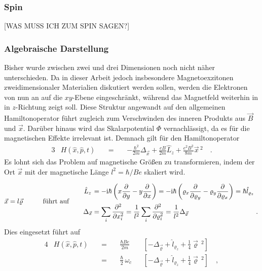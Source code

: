 \documentclass[a4paper,11pt, twoside]{article}
\newcommand{\+}{\dagger}
\newcommand{\pd}[2]{\frac{\partial #1}{\partial #2}}
\renewcommand{\'}{\tt\textquotesingle}
\renewcommand{\it}{\mathit}
\renewcommand{\v}{\vec}
\renewcommand{\^}{\hat}
\renewcommand{\tt}{\text}
\renewcommand{\~}{\widetilde}
\begin{document}
\subsubsection{Spin}
[WAS MUSS ICH ZUM SPIN SAGEN?]
\subsubsection{Algebraische Darstellung}
Bisher wurde zwischen zwei und drei Dimensionen noch nicht näher unterschieden. Da in dieser Arbeit jedoch insbesondere Magnetoexzitonen zweidimensionaler Materialien diskutiert werden sollen, werden die Elektronen von nun an auf die $xy$-Ebene eingeschränkt, während das Magnetfeld weiterhin in in $z$-Richtung zeigt soll. Diese Struktur angewandt auf den allgemeinen Hamiltonoperator führt zugleich zum Verschwinden des inneren Produkts aus $\v B$ und $\v x$. Darüber hinaus wird das Skalarpotential $\it \Phi$ vernachlässigt, da es für die magnetischen Effekte irrelevant ist. Demnach gilt für den Hamiltonoperator 
\begin{alignat*}{3}
& H(\^ x,\^ p,t)&& \ =\  && -\frac{\hbar^2}{2m}\Delta_{\v x} + \frac{eB}{2m} \^L_z  +\frac{e^2B^2}{8m}\v x \,^2  \quad .
\end{alignat*}
Es lohnt sich das Problem auf magnetische Größen zu transformieren, indem der Ort $\v x$ mit der magnetische Länge $l^2=\hbar / Be$ skaliert wird.
\begin{alignat*}{4}
\v x  = l \v \varrho  &&\qquad \tt{führt auf} \quad && 
\arraycolsep=1.4pt\def\arraystretch{2.2}
\begin{array}{*1{>{\displaystyle}c} *1{>{\displaystyle}l} *1{>{\displaystyle}r}}
 \^L_z  &= -\tt i \hbar \left (x\pd{}{y}-y\pd{}{x}\right ) =  -\tt i \hbar \left (\varrho_x\pd{}{\varrho_y}-\varrho_y\pd{}{\varrho_x}\right ) = \hbar \^l_{\varrho_z}& \\[4pt]
\Delta_{\v x} &= \sum_i \pd{^2}{x_i ^2} = \frac{1}{l^2}\sum_i \pd{^2}{\varrho_i ^2} = \frac{1}{l^2}\Delta_{\v \varrho} &.
\end{array} 
\end{alignat*}
Dies eingesetzt führt auf  
\begin{alignat*}{4}
& H(\^ x,\^ p,t)&& \ =\  &&\frac{\hbar B e}{2m} && \left [ -\Delta_{\v \varrho} +  \^l_{\varrho_z}  +\frac{1}{4}\v \varrho \,^2 \right ] \\
& && \ = \ && \frac{\hbar }{2}\,\omega_c && \left [ -\Delta_{\v \varrho} +  \^l_{\varrho_z}  +\frac{1}{4}\v \varrho \,^2 \right ] \quad , 
\end{alignat*}
\end{document}
